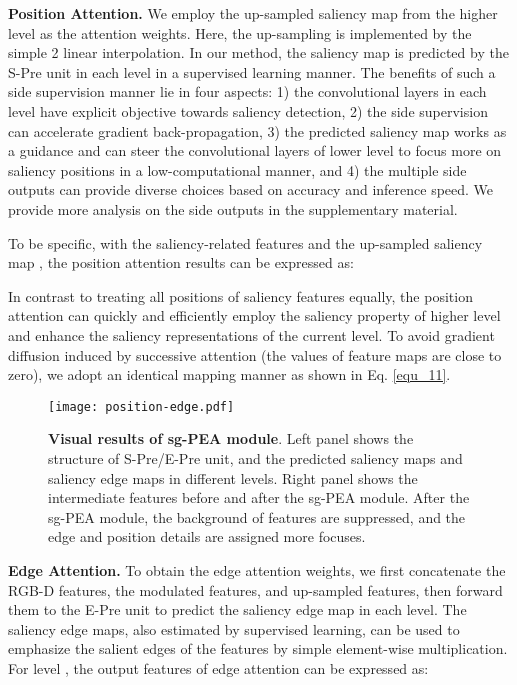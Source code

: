 \documentclass[runningheads]{llncs}
\begin{document}
\noindent
\textbf{Position Attention.} We employ the up-sampled saliency map from the higher level as the attention weights. Here, the up-sampling is implemented by the simple 2 linear interpolation. In our method, the saliency map is predicted by the S-Pre unit in each level in a supervised learning manner.
The benefits of such a side supervision manner lie in four aspects: 1) the convolutional layers in each level have explicit objective towards saliency detection, 2) the side supervision can accelerate gradient back-propagation, 3) the predicted saliency map works as a guidance and can steer the convolutional layers of lower level to focus more on saliency positions in a low-computational manner, and 4) the multiple side outputs can provide diverse choices based on accuracy and inference speed. We provide more analysis on the side outputs in the supplementary material.

To be specific, with the saliency-related features  and the up-sampled saliency map , the position attention results  can be expressed as:

In contrast to treating all positions of saliency features equally, the position attention can quickly and efficiently employ the saliency property of higher level and enhance the  saliency representations of the current level. To avoid gradient diffusion induced by successive attention (the values of feature maps are close to zero), we adopt an identical mapping manner as shown in Eq. \eqref{equ_11}.

\begin{figure*}[!t]
	\centering
	\texttt{[image: position-edge.pdf]}
	\caption{\textbf{Visual results of sg-PEA module}. Left panel shows the structure of S-Pre/E-Pre unit, and the predicted saliency maps and saliency edge maps in different levels. Right panel shows the intermediate features before and after the sg-PEA module. After the sg-PEA module, the background of features are suppressed, and the edge and position details are assigned more focuses. }
	\label{PEA}
\end{figure*}

\noindent
\textbf{Edge Attention.}
To obtain the edge attention weights, we first concatenate the RGB-D features, the modulated features, and up-sampled features, then forward them to the E-Pre unit to predict the saliency edge map in each level. The saliency edge maps, also estimated by supervised learning, can be used to emphasize the salient edges of the features by simple element-wise multiplication. For level , the output features of edge attention can be expressed as:
\end{document}
